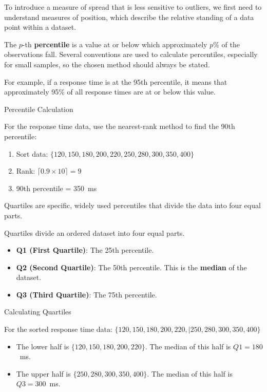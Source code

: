 To introduce a measure of spread that is less sensitive to outliers, we first need to understand measures of position, which describe the relative standing of a data point within a dataset.

\begin{definition}[Percentile]
The $p$-th \textbf{percentile} is a value at or below which approximately $p\%$ of the observations fall. Several conventions are used to calculate percentiles, especially for small samples, so the chosen method should always be stated.
\end{definition}

For example, if a response time is at the 95th percentile, it means that approximately 95\% of all response times are at or below this value.

\begin{example} Percentile Calculation

    For the response time data, use the nearest-rank method to find the 90th percentile:
\begin{enumerate}
        \item Sort data: $\{120, 150, 180, 200, 220, 250, 280, 300, 350, 400\}$
        \item Rank: $\lceil 0.9 \times 10\rceil = 9$
        \item 90th percentile = 350~ms
\end{enumerate}
    \end{example}

Quartiles are specific, widely used percentiles that divide the data into four equal parts.

\begin{definition}[Quartiles]

Quartiles divide an ordered dataset into four equal parts.

\begin{itemize}
    \item \textbf{Q1 (First Quartile)}: The 25th percentile.
    \item \textbf{Q2 (Second Quartile)}: The 50th percentile. This is the \textbf{median} of the dataset.
    \item \textbf{Q3 (Third Quartile)}: The 75th percentile.
\end{itemize}
\end{definition}

\begin{example} Calculating Quartiles

For the sorted response time data: $\{120, 150, 180, 200, 220, | 250, 280, 300, 350, 400\}$
\begin{itemize}
    \item The lower half is $\{120, 150, 180, 200, 220\}$. The median of this half is $Q1 = 180$~ms.
    \item The upper half is $\{250, 280, 300, 350, 400\}$. The median of this half is $Q3 = 300$~ms.
\end{itemize}
\end{example}

